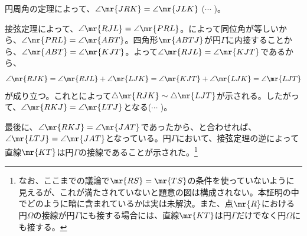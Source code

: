 円周角の定理によって、$\angle\mr{JRK}=\angle\mr{JLK}$ ($\cdots$ )。

接弦定理によって、$\angle\mr{RJL}=\angle\mr{PRL}$。によって同位角が等しいから、$\angle\mr{PRL}=\angle\mr{ABT}$。四角形$\mr{ABTJ}$が円$\Gamma$に内接することから、$\angle\mr{ABT}=\angle\mr{KJT}$。よって$\angle\mr{RJL}=\angle\mr{KJT}$であるから、
\[ \angle\mr{RJK}=\angle\mr{RJL}+\angle\mr{LJK}=\angle\mr{KJT}+\angle\mr{LJK}=\angle\mr{LJT} \]
が成り立つ。これとによって$\triangle\mr{RJK}\sim\triangle\mr{LJT}$が示される。したがって、$\angle\mr{RKJ}=\angle\mr{LTJ}$となる($\cdots$ )。

最後に、$\angle\mr{RKJ}=\angle\mr{JAT}$であったから、と合わせれば、$\angle\mr{LTJ}=\angle\mr{JAT}$となっている。円$\Gamma$において、接弦定理の逆によって直線$\mr{KT}$は円$\Gamma$の接線であることが示された。\footnote{なお、ここまでの議論で$\mr{RS}=\mr{TS}$の条件を使っていないように見えるが、これが満たされていないと題意の図は構成されない。本証明の中でどのように暗に含まれているかは実は未解決。また、点$\mr{R}$における円$\Omega$の接線が円$\Gamma$にも接する場合には、直線$\mr{KT}$は円$\Gamma$だけでなく円$\Omega$にも接する。}